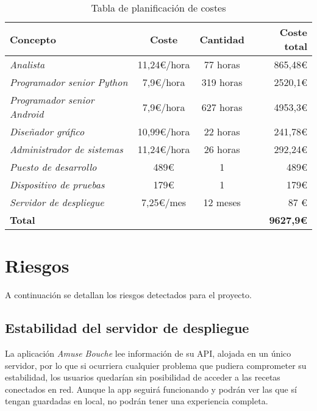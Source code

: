 \begin{table}[hbtp]
  \centering
  \begin{tabular}[h]{|l|c|c|r|}
    \hline
    \textbf{Concepto} & \textbf{Coste} & \textbf{Cantidad} & \textbf{Coste total} \\
    \hline
    \textit{Analista} & 11,24€/hora & 77 horas & 865,48€ \\
    \hline
    \textit{Programador senior Python} & 7,9€/hora & 319 horas & 2520,1€ \\
    \hline
    \textit{Programador senior Android} & 7,9€/hora & 627 horas & 4953,3€ \\
    \hline
    \textit{Diseñador gráfico} & 10,99€/hora & 22 horas & 241,78€ \\
    \hline
    \textit{Administrador de sistemas} & 11,24€/hora & 26 horas & 292,24€ \\
    \hline
    \textit{Puesto de desarrollo} & 489€ & 1 & 489€ \\
    \hline
    \textit{Dispositivo de pruebas} & 179€ & 1 & 179€ \\
    \hline
    \textit{Servidor de despliegue} & 7,25€/mes & 12 meses & 87 € \\
    \hline
    \textbf{Total} & \multicolumn{3}{r|}{\textbf{9627,9€}} \\
    \hline
  \end{tabular}
  \caption{Tabla de planificación de costes}
  \label{tab:costes}
\end{table}

\section{Riesgos}
\label{sec:riesgos}


A continuación se detallan los riesgos detectados para el proyecto.

\subsection{Estabilidad del servidor de despliegue}
\label{subsec:estabilidad-servidor}

La aplicación \textit{Amuse Bouche} lee información de su API, alojada en un
único servidor, por lo que si ocurriera cualquier problema que pudiera
comprometer su estabilidad, los usuarios quedarían sin posibilidad de acceder a
las recetas conectados en red. Aunque la app seguirá funcionando y podrán ver
las que sí tengan guardadas en local, no podrán tener una experiencia completa.

